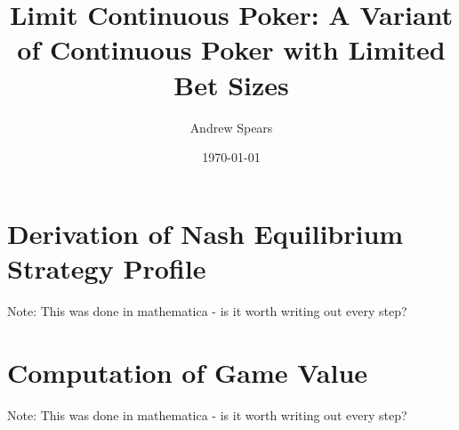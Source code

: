 \documentclass[a4paper,12pt]{article}
\title{Limit Continuous Poker: A Variant of Continuous Poker with Limited Bet Sizes}
\author{Andrew Spears}
\date{\today}
\theoremstyle{plain}
\theoremstyle{definition}
\begin{document}
\maketitle










\appendix
\section{Derivation of Nash Equilibrium Strategy Profile}
\label{app:derivation}
Note: This was done in mathematica - is it worth writing out every step?


\section{Computation of Game Value}
\label{app:value_computation}
Note: This was done in mathematica - is it worth writing out every step?


 
\end{document}
